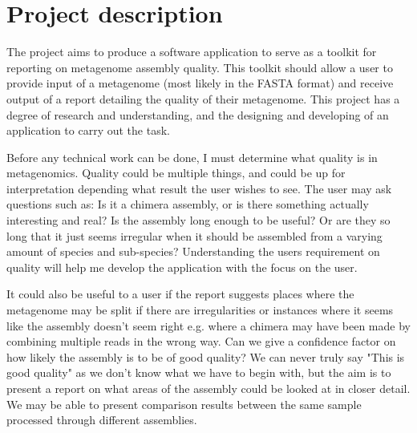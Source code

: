 \documentclass[11pt,fleqn,twoside]{article}
\begin{document}
\wordcount{}

\mmp

\setcounter{tocdepth}{3} %


\section{Project description}
The project aims to produce a software application to serve as a toolkit for reporting on metagenome assembly quality. This toolkit should allow a user to provide input of a metagenome\cite{metagenome} (most likely in the FASTA format\cite{fasta}) and receive output of a report detailing the quality of their metagenome. This project has a degree of research and understanding, and the designing and developing of an application to carry out the task.

Before any technical work can be done, I must determine what quality is in metagenomics. Quality could be multiple things, and could be up for interpretation depending what result the user wishes to see. The user may ask questions such as: Is it a chimera assembly, or is there something actually interesting and real? Is the assembly long enough to be useful? Or are they so long that it just seems irregular when it should be assembled from a varying amount of species and sub-species? Understanding the users requirement on quality will help me develop the application with the focus on the user.

It could also be useful to a user if the report suggests places where the metagenome may be split if there are irregularities or instances where it seems like the assembly doesn't seem right e.g. where a chimera may have been made by combining multiple reads in the wrong way. Can we give a confidence factor on how likely the assembly is to be of good quality? We can never truly say "This is good quality" as we don't know what we have to begin with, but the aim is to present a report on what areas of the assembly could be looked at in closer detail. We may be able to present comparison results between the same sample processed through different assemblies.
\end{document}
